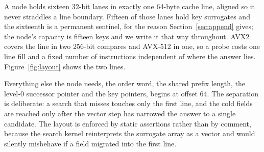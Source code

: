 \documentclass[conference]{IEEEtran}
\begin{document}
A node holds sixteen 32-bit lanes in exactly one 64-byte cache line, aligned so it
never straddles a line boundary. Fifteen of those lanes hold key surrogates and the
sixteenth is a permanent sentinel, for the reason Section~\ref{sec:append} gives;
the node's capacity is fifteen keys and we write it that way throughout. AVX2
covers the line in two 256-bit compares and AVX-512 in one, so a probe costs one
line fill and a fixed number of instructions independent of where the answer lies.
Figure~\ref{fig:layout} shows the two lines.

Everything else the node needs, the order word, the shared prefix length, the
level-0 successor pointer and the key pointers, begins at offset 64.
The separation is deliberate: a search that misses touches only the first line,
and the cold fields are reached only after the vector step has narrowed the answer
to a single candidate. The layout is enforced by static assertions rather than by
comment, because the search kernel reinterprets the surrogate array as a vector
and would silently misbehave if a field migrated into the first line.
\end{document}
